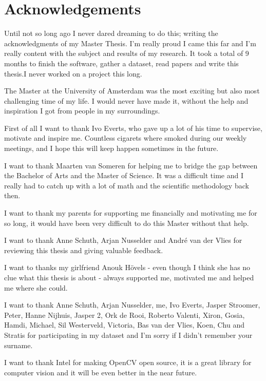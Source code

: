 \documentclass[a4paper, 11pt]{book}
\begin{document}
\setcounter{page}{1}

\tableofcontents{}
\listoffigures{}
\listoftables{}

\chapter*{Acknowledgements}
Until not so long ago I never dared dreaming to do this; writing the acknowledgments of my Master Thesis. I'm really proud I came this far and I'm really content with the subject and results of my research. It took a total of 9 months to finish the software, gather a dataset, read papers and write this thesis.I never worked on a project this long.

The Master at the University of Amsterdam was the most exciting but also most challenging time of my life. I would never have made it, without the help and inspiration I got from people in my surroundings. 

First of all I want to thank Ivo Everts, who gave up a lot of his time to supervise, motivate and inspire me. Countless cigarets where smoked during our weekly meetings, and I hope this will keep happen sometimes in the future.

I want to thank Maarten van Someren for helping me to bridge the gap between the Bachelor of Arts and the Master of Science. It was a difficult time and I really had to catch up with a lot of math and the scientific methodology back then. 

I want to thank my parents for supporting me financially and motivating me for so long, it would have been very difficult to do this Master without that help.

I want to thank Anne Schuth, Arjan Nusselder and Andr\'{e} van der Vlies for reviewing this thesis and giving valuable feedback.

I want to thanks my girlfriend Anouk H\"{o}vels - even though I think she has no clue what this thesis is about - always supported me, motivated me and helped me where she could.

I want to thank Anne Schuth, Arjan Nusselder, me, Ivo Everts, Jasper Stroomer, Peter, Hanne Nijhuis, Jasper 2, Ork de Rooi, Roberto Valenti, Xiron, Gosia, Hamdi, Michael, Sil Westerveld, Victoria, Bas van der Vlies, Koen, Chu and Stratis for participating in my dataset and I'm sorry if I didn't remember your surname. 

I want to thank Intel for making OpenCV open source, it is a great library for computer vision and it will be even better in the near future. 
\end{document}
